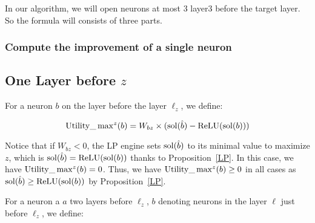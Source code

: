 {In our algorithm, we will open neurons at most 3 layer3 before the target layer. So the formula will consists of three parts.


\subsubsection*{Compute the improvement of a single neuron}

\subsection*{One Layer before $z$}

\fi


For a neuron $b$ on the layer before the layer $\ell_z$, we define:


\vspace{-0.4cm}
	$$\mathrm{Utility}\_\max\nolimits^z(b) = W_{bz} \times (\mathrm{sol}(\hat{b})- \mathrm{ReLU}(\mathrm{sol}(b)))$$
\vspace{-0.4cm}
	

Notice that if $W_{bz}<0$, the LP engine sets $\mathrm{sol}(\hat{b})$ to its minimal value
to maximize $z$, which is $\mathrm{sol}(\hat{b})=\mathrm{ReLU}(\mathrm{sol}(b))$ thanks to Proposition~\ref{LP}. 
In this case, we have $\mathrm{Utility}\_\max^z(b)=0$.
Thus, we have $\mathrm{Utility}\_\max^z(b) \geq 0$ in all cases
as $\mathrm{sol}(\hat{b}) \geq \mathrm{ReLU}(\mathrm{sol}(b))$ by Proposition~\ref{LP}. 

For a neuron a $a$ two layers before $\ell_z$, 
$b$ denoting neurons in the layer $\ell$ just before $\ell_z$, 
we define:

}
